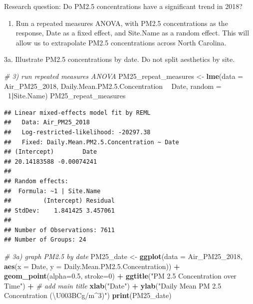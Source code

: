 \documentclass[]{article}
\newenvironment{Shaded}{\begin{snugshade}}{\end{snugshade}}
\newcommand{\KeywordTok}[1]{\textcolor[rgb]{0.13,0.29,0.53}{\textbf{#1}}}
\newcommand{\DataTypeTok}[1]{\textcolor[rgb]{0.13,0.29,0.53}{#1}}
\newcommand{\DecValTok}[1]{\textcolor[rgb]{0.00,0.00,0.81}{#1}}
\newcommand{\FloatTok}[1]{\textcolor[rgb]{0.00,0.00,0.81}{#1}}
\newcommand{\StringTok}[1]{\textcolor[rgb]{0.31,0.60,0.02}{#1}}
\newcommand{\CommentTok}[1]{\textcolor[rgb]{0.56,0.35,0.01}{\textit{#1}}}
\newcommand{\OperatorTok}[1]{\textcolor[rgb]{0.81,0.36,0.00}{\textbf{#1}}}
\newcommand{\NormalTok}[1]{#1}
\providecommand{\tightlist}{%
  \setlength{\itemsep}{0pt}\setlength{\parskip}{0pt}}
\begin{document}
Research question: Do PM2.5 concentrations have a significant trend in
2018?

\begin{enumerate}
\def\labelenumi{\arabic{enumi}.}
\setcounter{enumi}{2}
\tightlist
\item
  Run a repeated measures ANOVA, with PM2.5 concentrations as the
  response, Date as a fixed effect, and Site.Name as a random effect.
  This will allow us to extrapolate PM2.5 concentrations across North
  Carolina.
\end{enumerate}

3a. Illustrate PM2.5 concentrations by date. Do not split aesthetics by
site.

\begin{Shaded}
\begin{Highlighting}[]
\CommentTok{# 3) run repeated measures ANOVA}
\NormalTok{PM25_repeat_measures <-}\StringTok{ }\KeywordTok{lme}\NormalTok{(}\DataTypeTok{data =}\NormalTok{ Air_PM25_}\DecValTok{2018}\NormalTok{,}
\NormalTok{                     Daily.Mean.PM2.}\FloatTok{5.}\NormalTok{Concentration }\OperatorTok{~}\StringTok{ }\NormalTok{Date, }
                     \DataTypeTok{random =} \OperatorTok{~}\DecValTok{1}\OperatorTok{|}\NormalTok{Site.Name)}
\NormalTok{PM25_repeat_measures}
\end{Highlighting}
\end{Shaded}

\begin{verbatim}
## Linear mixed-effects model fit by REML
##   Data: Air_PM25_2018 
##   Log-restricted-likelihood: -20297.38
##   Fixed: Daily.Mean.PM2.5.Concentration ~ Date 
## (Intercept)        Date 
## 20.14183588 -0.00074241 
## 
## Random effects:
##  Formula: ~1 | Site.Name
##         (Intercept) Residual
## StdDev:    1.841425 3.457061
## 
## Number of Observations: 7611
## Number of Groups: 24
\end{verbatim}

\begin{Shaded}
\begin{Highlighting}[]
\CommentTok{# 3a) graph PM2.5 by date}
\NormalTok{PM25_date <-}\StringTok{ }\KeywordTok{ggplot}\NormalTok{(}\DataTypeTok{data =}\NormalTok{ Air_PM25_}\DecValTok{2018}\NormalTok{, }\KeywordTok{aes}\NormalTok{(}\DataTypeTok{x =}\NormalTok{ Date, }\DataTypeTok{y =}\NormalTok{ Daily.Mean.PM2.}\FloatTok{5.}\NormalTok{Concentration)) }\OperatorTok{+}\StringTok{   }
\StringTok{  }\KeywordTok{geom_point}\NormalTok{(}\DataTypeTok{alpha=}\FloatTok{0.5}\NormalTok{, }\DataTypeTok{stroke=}\DecValTok{0}\NormalTok{) }\OperatorTok{+}\StringTok{ }
\StringTok{  }\KeywordTok{ggtitle}\NormalTok{(}\StringTok{"PM 2.5 Concentration over Time"}\NormalTok{) }\OperatorTok{+}\StringTok{ }\CommentTok{# add main title}
\StringTok{  }\KeywordTok{xlab}\NormalTok{(}\StringTok{"Date"}\NormalTok{) }\OperatorTok{+}
\StringTok{  }\KeywordTok{ylab}\NormalTok{(}\StringTok{"Daily Mean PM 2.5 Concentration (\textbackslash{}U003BCg/m^3)"}\NormalTok{)}
\KeywordTok{print}\NormalTok{(PM25_date)}
\end{Highlighting}
\end{Shaded}
\end{document}
